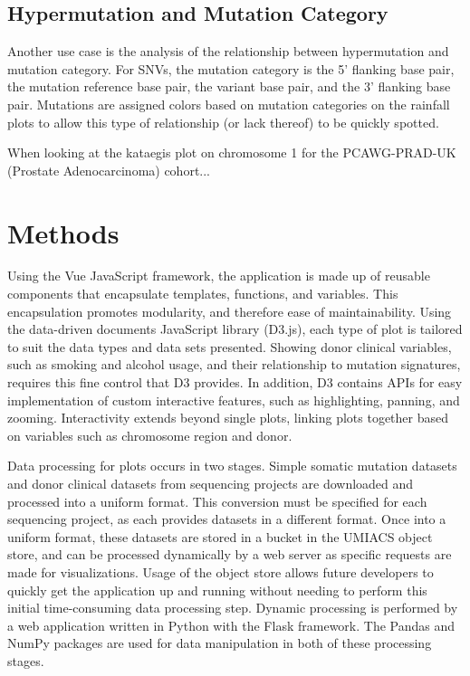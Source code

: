 \documentclass[12pt, letterpaper]{article}
\begin{document}
\subsection{Hypermutation and Mutation Category}
Another use case is the analysis of the relationship between hypermutation and mutation category.
For SNVs, the mutation category is the 5' flanking base pair, the mutation reference base pair, the variant base pair, and the 3' flanking base pair.
Mutations are assigned colors based on mutation categories on the rainfall plots to allow this type of relationship (or lack thereof) to be quickly spotted.

When looking at the kataegis plot on chromosome 1 for the PCAWG-PRAD-UK (Prostate Adenocarcinoma) cohort...



\section{Methods}
Using the Vue JavaScript framework, the application is made up of reusable components that encapsulate templates, functions, and variables.
This encapsulation promotes modularity, and therefore ease of maintainability.
Using the data-driven documents JavaScript library (D3.js)\cite{bostock2011d3}, each type of plot is tailored to suit the data types and data sets presented.
Showing donor clinical variables, such as smoking and alcohol usage, and their relationship to mutation signatures, requires this fine control that D3 provides.
In addition, D3 contains APIs for easy implementation of custom interactive features, such as highlighting, panning, and zooming.
Interactivity extends beyond single plots, linking plots together based on variables such as chromosome region and donor.

Data processing for plots occurs in two stages. 
Simple somatic mutation datasets and donor clinical datasets from sequencing projects are downloaded and processed into a uniform format. 
This conversion must be specified for each sequencing project, as each provides datasets in a different format.
Once into a uniform format, these datasets are stored in a bucket in the UMIACS object store, and can be processed dynamically by a web server as specific requests are made for visualizations.
Usage of the object store allows future developers to quickly get the application up and running without needing to perform this initial time-consuming data processing step.
Dynamic processing is performed by a web application written in Python with the Flask framework. 
The Pandas and NumPy packages are used for data manipulation in both of these processing stages.
\end{document}
